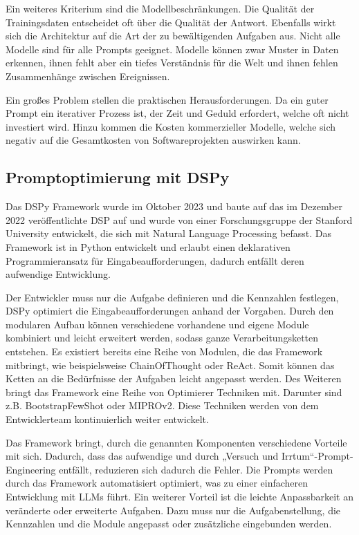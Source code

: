 Ein weiteres Kriterium sind die Modellbeschränkungen. Die Qualität der Trainingsdaten entscheidet oft über die Qualität der Antwort. Ebenfalls wirkt sich die Architektur auf die Art der zu bewältigenden Aufgaben aus. Nicht alle Modelle sind für alle Prompts geeignet. Modelle können zwar Muster in Daten erkennen, ihnen fehlt aber ein tiefes Verständnis für die Welt und ihnen fehlen Zusammenhänge zwischen Ereignissen.\vspace{0.2cm}

Ein großes Problem stellen die praktischen Herausforderungen. Da ein guter Prompt ein iterativer Prozess ist, der Zeit und Geduld erfordert, welche oft nicht investiert wird. Hinzu kommen die Kosten kommerzieller Modelle, welche sich negativ auf die Gesamtkosten von Softwareprojekten auswirken kann.


\subsection{Promptoptimierung mit DSPy}
Das DSPy Framework wurde im Oktober 2023 und baute auf das im Dezember 2022 veröffentlichte DSP auf und wurde von einer Forschungsgruppe der Stanford University entwickelt, die sich mit Natural Language Processing befasst. Das Framework ist in Python entwickelt und erlaubt einen deklarativen Programmieransatz für Eingabeaufforderungen, dadurch entfällt deren aufwendige Entwicklung.\vspace{0.2cm}

Der Entwickler muss nur die Aufgabe definieren und die Kennzahlen festlegen, DSPy optimiert die Eingabeaufforderungen anhand der Vorgaben. Durch den modularen Aufbau können verschiedene vorhandene und eigene Module kombiniert und leicht erweitert werden, sodass ganze Verarbeitungsketten entstehen. Es existiert bereits eine Reihe von Modulen, die das Framework mitbringt, wie beispielsweise ChainOfThought oder ReAct. Somit können das Ketten an die Bedürfnisse der Aufgaben leicht angepasst werden. Des Weiteren bringt das Framework eine Reihe von Optimierer Techniken mit. Darunter sind z.B. BootstrapFewShot oder MIPROv2. Diese Techniken werden von dem Entwicklerteam kontinuierlich weiter entwickelt.\vspace{0.2cm}

Das Framework bringt, durch die genannten Komponenten verschiedene Vorteile mit sich. Dadurch, dass das aufwendige und durch „Versuch und Irrtum“-Prompt-Engineering entfällt, reduzieren sich dadurch die Fehler. Die Prompts werden durch das Framework automatisiert optimiert, was zu einer einfacheren Entwicklung mit LLMs führt. Ein weiterer Vorteil ist die leichte Anpassbarkeit an veränderte oder erweiterte Aufgaben. Dazu muss nur die Aufgabenstellung, die Kennzahlen und die Module angepasst oder zusätzliche eingebunden werden.\vspace{0.2cm}

